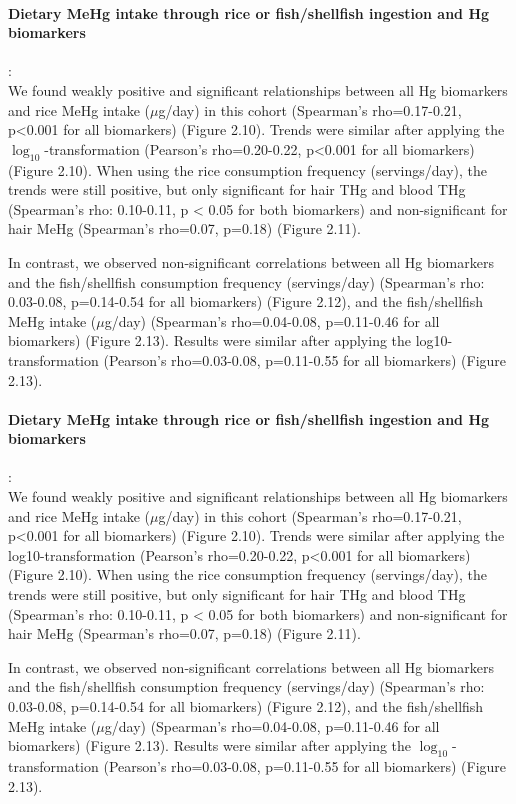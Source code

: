 \paragraph {Dietary MeHg intake through rice or fish/shellfish ingestion and Hg biomarkers}: \\ We found weakly positive and significant relationships between all Hg biomarkers and rice MeHg intake (\({\mu}\)g/day) in this cohort (Spearman's rho=0.17-0.21, p<0.001 for all biomarkers) (Figure 2.10). Trends were similar after applying the $\log_{10}$-transformation (Pearson's rho=0.20-0.22, p<0.001 for all biomarkers) (Figure 2.10). When using the rice consumption frequency (servings/day), the trends were still positive, but only significant for hair THg and blood THg (Spearman's rho: 0.10-0.11, p < 0.05 for both biomarkers) and non-significant for hair MeHg (Spearman's rho=0.07, p=0.18) (Figure 2.11). 

In contrast, we observed non-significant correlations between all Hg biomarkers and the fish/shellfish consumption frequency (servings/day) (Spearman's rho: 0.03-0.08, p=0.14-0.54 for all biomarkers) (Figure 2.12), and the fish/shellfish MeHg intake (\({\mu}\)g/day) (Spearman's rho=0.04-0.08, p=0.11-0.46 for all biomarkers) (Figure 2.13). Results were similar after applying the log10-transformation (Pearson's rho=0.03-0.08, p=0.11-0.55 for all biomarkers) (Figure 2.13). 

\paragraph {Dietary MeHg intake through rice or fish/shellfish ingestion and Hg biomarkers}:\\ We found weakly positive and significant relationships between all Hg biomarkers and rice MeHg intake (\({\mu}\)g/day) in this cohort (Spearman's rho=0.17-0.21, p<0.001 for all biomarkers) (Figure 2.10). Trends were similar after applying the log10-transformation (Pearson's rho=0.20-0.22, p<0.001 for all biomarkers) (Figure 2.10). When using the rice consumption frequency (servings/day), the trends were still positive, but only significant for hair THg and blood THg (Spearman's rho: 0.10-0.11, p < 0.05 for both biomarkers) and non-significant for hair MeHg (Spearman's rho=0.07, p=0.18) (Figure 2.11). 

In contrast, we observed non-significant correlations between all Hg biomarkers and the fish/shellfish consumption frequency (servings/day) (Spearman's rho: 0.03-0.08, p=0.14-0.54 for all biomarkers) (Figure 2.12), and the fish/shellfish MeHg intake (\({\mu}\)g/day) (Spearman's rho=0.04-0.08, p=0.11-0.46 for all biomarkers) (Figure 2.13). Results were similar after applying the $\log_{10}$-transformation (Pearson's rho=0.03-0.08, p=0.11-0.55 for all biomarkers) (Figure 2.13). 

